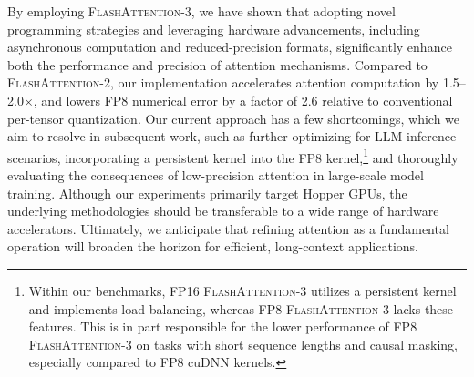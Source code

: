 By employing \textsc{FlashAttention-3}, we have shown that adopting novel programming strategies and leveraging hardware advancements, including asynchronous computation and reduced-precision formats, significantly enhance both the performance and precision of attention mechanisms. Compared to \textsc{FlashAttention-2}, our implementation accelerates attention computation by 1.5–2.0$\times$, and lowers FP8 numerical error by a factor of 2.6 relative to conventional per-tensor quantization. Our current approach has a few shortcomings, which we aim to resolve in subsequent work, such as further optimizing for LLM inference scenarios, incorporating a persistent kernel into the FP8 kernel,\footnote{Within our benchmarks, FP16 \textsc{FlashAttention-3} utilizes a persistent kernel and implements load balancing, whereas FP8 \textsc{FlashAttention-3} lacks these features. This is in part responsible for the lower performance of FP8 \textsc{FlashAttention-3} on tasks with short sequence lengths and causal masking, especially compared to FP8 cuDNN kernels.} and thoroughly evaluating the consequences of low-precision attention in large-scale model training. Although our experiments primarily target Hopper GPUs, the underlying methodologies should be transferable to a wide range of hardware accelerators. Ultimately, we anticipate that refining attention as a fundamental operation will broaden the horizon for efficient, long-context applications.

